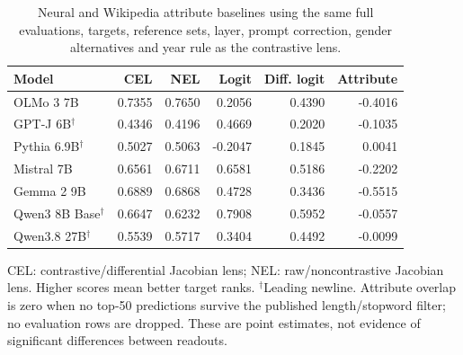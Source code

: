 \begin{table}[t]
\centering\small
\caption{Neural and Wikipedia attribute baselines using the same full evaluations, targets, reference sets, layer, prompt correction, gender alternatives and year rule as the contrastive lens.}
\label{tab:full-baselines}
\begin{tabular}{@{}lrrrrr@{}}
\toprule
Model & CEL & NEL & Logit & Diff. logit & Attribute \\
\midrule
OLMo 3 7B & 0.7355 & 0.7650 & 0.2056 & 0.4390 & -0.4016 \\
GPT-J 6B$^{\dagger}$ & 0.4346 & 0.4196 & 0.4669 & 0.2020 & -0.1035 \\
Pythia 6.9B$^{\dagger}$ & 0.5027 & 0.5063 & -0.2047 & 0.1845 & 0.0041 \\
Mistral 7B & 0.6561 & 0.6711 & 0.6581 & 0.5186 & -0.2202 \\
Gemma 2 9B & 0.6889 & 0.6868 & 0.4728 & 0.3436 & -0.5515 \\
Qwen3 8B Base$^{\dagger}$ & 0.6647 & 0.6232 & 0.7908 & 0.5952 & -0.0557 \\
Qwen3.8 27B$^{\dagger}$ & 0.5539 & 0.5717 & 0.3404 & 0.4492 & -0.0099 \\
\bottomrule
\end{tabular}
\par\smallskip\begin{minipage}{\linewidth}\footnotesize CEL: contrastive/differential Jacobian lens; NEL: raw/noncontrastive Jacobian lens. Higher scores mean better target ranks. $^{\dagger}$Leading newline. Attribute overlap is zero when no top-50 predictions survive the published length/stopword filter; no evaluation rows are dropped. These are point estimates, not evidence of significant differences between readouts.\end{minipage}
\end{table}

